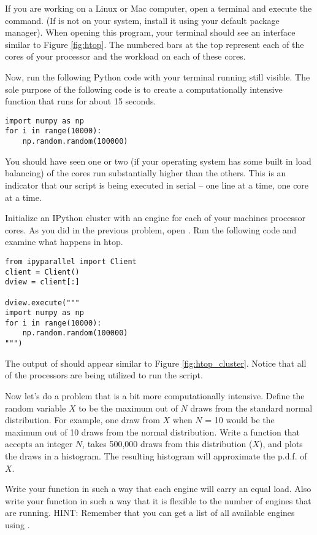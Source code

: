 %
%
If you are working on a Linux or Mac computer, open a terminal and execute the  command. (If  is not on your system, install it using your default package manager). 
When opening this program, your terminal should see an interface similar to Figure \ref{fig:htop}. 
The numbered bars at the top represent each of the cores of your processor and the workload on each of these cores.

Now, run the following Python code with your terminal running  still visible. 
The sole purpose of the following code is to create a computationally intensive function that runs for about 15 seconds.

\begin{lstlisting}
import numpy as np
for i in range(10000):
    np.random.random(100000)
\end{lstlisting}

You should have seen one or two (if your operating system has some built in load balancing) of the cores run substantially higher than the others. 
This is an indicator that our script is being executed in serial -- one line at a time, one core at a time.

Initialize an IPython cluster with an engine for each of your machines processor cores. 
As you did in the previous problem, open . 
Run the following code and examine what happens in htop.

\begin{lstlisting}
from ipyparallel import Client
client = Client()
dview = client[:]

dview.execute("""
import numpy as np
for i in range(10000):
    np.random.random(100000)
""")
\end{lstlisting}

The output of  should appear similar to Figure \ref{fig:htop_cluster}. 
Notice that all of the processors are being utilized to run the script.

Now let's do a problem that is a bit more computationally intensive. 
Define the random variable $X$ to be the maximum out of $N$ draws from the standard normal distribution.
For example, one draw from $X$ when $N$ = 10 would be the maximum out of 10 draws from the normal distribution.
Write a function that accepts an integer $N$, takes 500,000 draws from this distribution ($X$), and plots the draws in a histogram.
The resulting histogram will approximate the p.d.f. of $X$.

Write your function in such a way that each engine will carry an equal load. Also write your function in such a way that it is flexible to the number of engines that are running. HINT: Remember that you can get a list of all available engines using .
